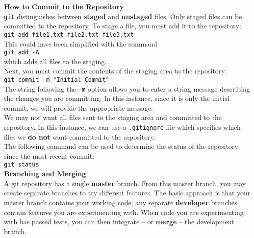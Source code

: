 \documentclass[11pt]{article}
\begin{document}
\noindent
{\bf How to Commit to the Repository} \\

\noindent
{\tt git} distinguishes between {\bf staged} and {\bf unstaged} files. Only staged files can be committed to the repository. To stage a file, you must add it to the repository: \\

{\tt git add file1.txt file2.txt file3.txt} \\

\noindent
This could have been simplified with the command \\

{\tt git add -A} \\

\noindent
which adds all files to the staging. \\

\noindent
Next, you must commit the contents of the staging area to the repository: \\

{\tt git commit -m "Initial Commit"} \\

\noindent
The string following the {\tt -m} option allows you to enter a string message describing the changes you are committing. In this instance, since it is only the initial commit, we will provide the appropriate message. \\

\noindent
We may not want all files sent to the staging area and committed to the repository. In this instance, we can use a {\tt .gitignore} file which specifies which files we {\bf do not} want committed to the repository. \\

\noindent
The following command can be used to determine the status of the repository since the most recent commit: \\

{\tt git status} \\

\noindent
{\bf Branching and Merging} \\

\noindent
A git repository has a single {\bf master} branch. From this master branch, you may create separate branches to try different features. The basic approach is that your master branch contains your working code, any separate {\bf developer} branches contain features you are experimenting with. When code you are experimenting with has passed tests, you can then integrate -- or {\bf merge} -- the development branch. \\
\end{document}
